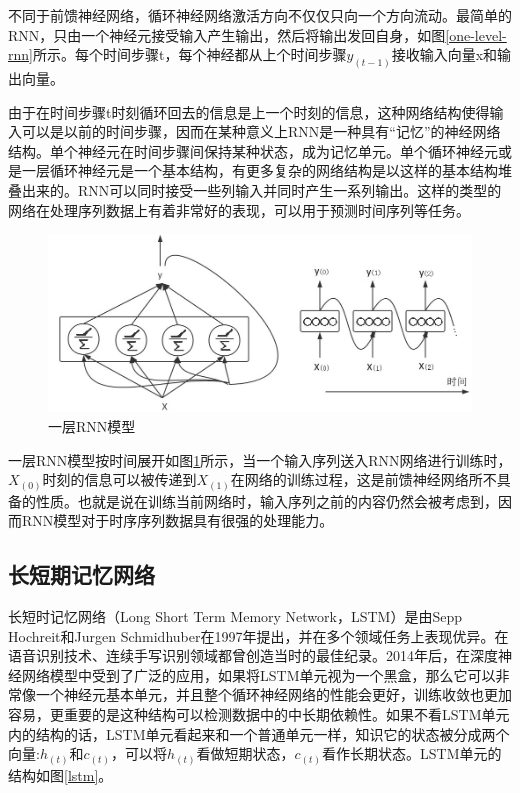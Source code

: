 \documentclass[winfonts,master,oneside,nobackinfo]{njuthesis}
\begin{document}
不同于前馈神经网络，循环神经网络激活方向不仅仅只向一个方向流动。最简单的RNN，只由一个神经元接受输入产生输出，然后将输出发回自身，如图\ref{one-level-rnn}所示。每个时间步骤t，每个神经都从上个时间步骤$y _ { ( t - 1 ) }$接收输入向量x和输出向量。

由于在时间步骤t时刻循环回去的信息是上一个时刻的信息，这种网络结构使得输入可以是以前的时间步骤，因而在某种意义上RNN是一种具有“记忆”的神经网络结构。单个神经元在时间步骤间保持某种状态，成为记忆单元。单个循环神经元或是一层循环神经元是一个基本结构，有更多复杂的网络结构是以这样的基本结构堆叠出来的。RNN可以同时接受一些列输入并同时产生一系列输出。这样的类型的网络在处理序列数据上有着非常好的表现，可以用于预测时间序列等任务。

\begin{figure}[h]
\centering
\includegraphics[width=1\textwidth]{./figure/一层RNN.jpg}
\caption{一层RNN模型}
\label{a-layer-rnn}
\end{figure}

一层RNN模型按时间展开如图\ref{a-layer-rnn}所示，当一个输入序列送入RNN网络进行训练时，$X_{(0)}$时刻的信息可以被传递到$X_{(1)}$在网络的训练过程，这是前馈神经网络所不具备的性质。也就是说在训练当前网络时，输入序列之前的内容仍然会被考虑到，因而RNN模型对于时序序列数据具有很强的处理能力。

\subsection{长短期记忆网络}

长短时记忆网络（Long Short Term Memory Network，LSTM）是由Sepp Hochreit和Jurgen Schmidhuber在1997年提出\cite{Hochreit}，并在多个领域任务上表现优异。在语音识别技术、连续手写识别领域都曾创造当时的最佳纪录。2014年后，在深度神经网络模型中受到了广泛的应用，如果将LSTM单元视为一个黑盒，那么它可以非常像一个神经元基本单元，并且整个循环神经网络的性能会更好，训练收敛也更加容易，更重要的是这种结构可以检测数据中的中长期依赖性。如果不看LSTM单元内的结构的话，LSTM单元看起来和一个普通单元一样，知识它的状态被分成两个向量:${ h } _ { ( t ) }$和$ { c } _ { ( t ) }$，可以将${ h } _ { ( t ) }$看做短期状态，${ c } _ { ( t ) }$看作长期状态。LSTM单元的结构如图\ref{lstm}。
\end{document}
